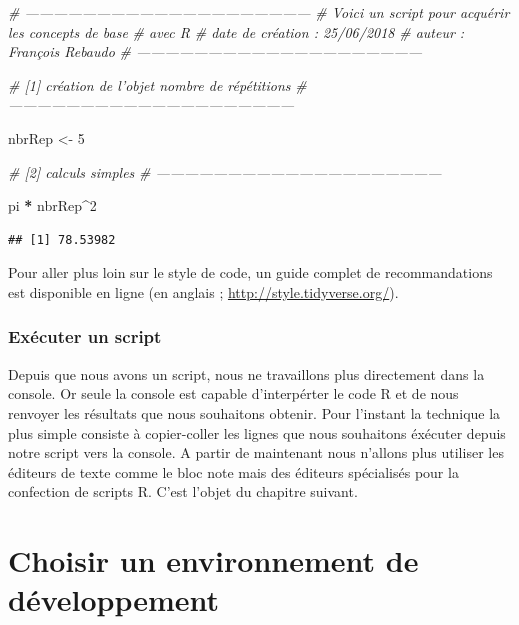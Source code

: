 \documentclass[]{book}
\makeatletter
\newenvironment{Shaded}{\begin{snugshade}}{\end{snugshade}}
\newcommand{\DecValTok}[1]{\textcolor[rgb]{0.00,0.00,0.81}{#1}}
\newcommand{\StringTok}[1]{\textcolor[rgb]{0.31,0.60,0.02}{#1}}
\newcommand{\CommentTok}[1]{\textcolor[rgb]{0.56,0.35,0.01}{\textit{#1}}}
\newcommand{\OperatorTok}[1]{\textcolor[rgb]{0.81,0.36,0.00}{\textbf{#1}}}
\newcommand{\NormalTok}[1]{#1}
\newenvironment{kframe}{%
\medskip{}
\setlength{\fboxsep}{.8em}
 \def\at@end@of@kframe{}%
 \ifinner\ifhmode%
  \def\at@end@of@kframe{\end{minipage}}%
  \begin{minipage}{\columnwidth}%
 \fi\fi%
 \def\FrameCommand##1{\hskip\@totalleftmargin \hskip-\fboxsep
 \colorbox{shadecolor}{##1}\hskip-\fboxsep
     \hskip-\linewidth \hskip-\@totalleftmargin \hskip\columnwidth}%
 \MakeFramed {\advance\hsize-\width
   \@totalleftmargin\z@ \linewidth\hsize
   \@setminipage}}%
 {\par\unskip\endMakeFramed%
 \at@end@of@kframe}
\newenvironment{rmdblock}[1]
  {
  \begin{itemize}
  \renewcommand{\labelitemi}{
    \raisebox{-.7\height}[0pt][0pt]{
      {\setkeys{Gin}{width=3em,keepaspectratio}\texttt{[image: myIcons/\#1]}} %
    }
  }
  \setlength{\fboxsep}{1em}
  \begin{kframe}
  \item
  }
  {
  \end{kframe}
  \end{itemize}
  }
\newenvironment{rmdstyle}     %
  {\begin{rmdblock}{style}}   %
  {\end{rmdblock}}            %
\makeatother
\begin{document}
\begin{Shaded}
\begin{Highlighting}[]
\CommentTok{# ------------------------------------------------------------}
\CommentTok{# Voici un script pour acquérir les concepts de base }
\CommentTok{# avec R}
\CommentTok{# date de création : 25/06/2018}
\CommentTok{# auteur : François Rebaudo}
\CommentTok{# ------------------------------------------------------------}

\CommentTok{# [1] création de l'objet nombre de répétitions}
\CommentTok{# ------------------------------------------------------------}

\NormalTok{nbrRep <-}\StringTok{ }\DecValTok{5}

\CommentTok{# [2] calculs simples}
\CommentTok{# ------------------------------------------------------------}

\NormalTok{pi }\OperatorTok{*}\StringTok{ }\NormalTok{nbrRep}\OperatorTok{^}\DecValTok{2}
\end{Highlighting}
\end{Shaded}

\begin{verbatim}
## [1] 78.53982
\end{verbatim}

\begin{rmdstyle}
Pour aller plus loin sur le style de code, un guide complet de
recommandations est disponible en ligne (en anglais ;
\url{http://style.tidyverse.org/}).
\end{rmdstyle}

\subsection{Exécuter un script}\label{executer-un-script}

Depuis que nous avons un script, nous ne travaillons plus directement
dans la console. Or seule la console est capable d'interpérter le code R
et de nous renvoyer les résultats que nous souhaitons obtenir. Pour
l'instant la technique la plus simple consiste à copier-coller les
lignes que nous souhaitons éxécuter depuis notre script vers la console.
A partir de maintenant nous n'allons plus utiliser les éditeurs de texte
comme le bloc note mais des éditeurs spécialisés pour la confection de
scripts R. C'est l'objet du chapitre suivant.

\chapter{Choisir un environnement de développement}\label{IDE}
\end{document}
